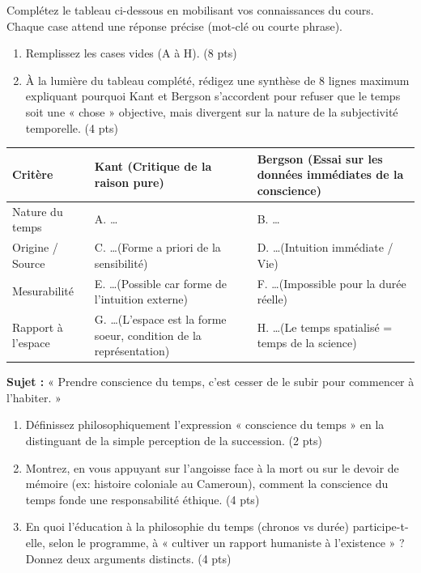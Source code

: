 \documentclass[11pt]{article}
\begin{document}
\begin{exercice}
Complétez le tableau ci-dessous en mobilisant vos connaissances du cours. Chaque case attend une réponse précise (mot-clé ou courte phrase).
\begin{enumerate}
    \item Remplissez les cases vides (A à H). (8 pts)
    \item À la lumière du tableau complété, rédigez une synthèse de 8 lignes maximum expliquant pourquoi Kant et Bergson s'accordent pour refuser que le temps soit une « chose » objective, mais divergent sur la nature de la subjectivité temporelle. (4 pts)
\end{enumerate}

\begin{tabular}{|p{2.8cm}|p{5.5cm}|p{5.5cm}|}
\hline
\textbf{Critère} & \textbf{Kant (Critique de la raison pure)} & \textbf{Bergson (Essai sur les données immédiates de la conscience)} \\
\hline
Nature du temps & A. \ldots & B. \ldots \\
\hline
Origine / Source & C. \ldots (Forme a priori de la sensibilité) & D. \ldots (Intuition immédiate / Vie) \\
\hline
Mesurabilité & E. \ldots (Possible car forme de l'intuition externe) & F. \ldots (Impossible pour la durée réelle) \\
\hline
Rapport à l'espace & G. \ldots (L'espace est la forme soeur, condition de la représentation) & H. \ldots (Le temps spatialisé = temps de la science) \\
\hline
\end{tabular}
\end{exercice}

\begin{exercice}
\textbf{Sujet :} « Prendre conscience du temps, c'est cesser de le subir pour commencer à l'habiter. »
\begin{enumerate}
    \item Définissez philosophiquement l'expression « conscience du temps » en la distinguant de la simple perception de la succession. (2 pts)
    \item Montrez, en vous appuyant sur l'angoisse face à la mort ou sur le devoir de mémoire (ex: histoire coloniale au Cameroun), comment la conscience du temps fonde une responsabilité éthique. (4 pts)
    \item En quoi l'éducation à la philosophie du temps (chronos vs durée) participe-t-elle, selon le programme, à « cultiver un rapport humaniste à l'existence » ? Donnez deux arguments distincts. (4 pts)
\end{enumerate}
\end{exercice}
\end{document}
